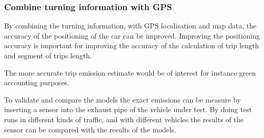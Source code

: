 \subsubsection{Combine turning information with GPS }

By combining the turning information, with GPS localisation and map data, the accuracy of the positioning of the car can be improved. Improving the positioning accuracy is important for improving the accuracy of the calculation of trip length and segment of trips length.


The more accurate trip emission estimate would be of interest for instance green accounting purposes.

To validate and compare the models the exact emissions can be measure by inserting a sensor into the exhaust pipe of the vehicle under test. By doing test runs in different kinds of traffic, and with different vehicles the results of the sensor can be compared with the results of the models.